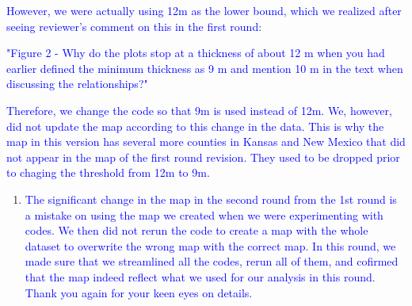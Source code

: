 \documentclass[
]{article}
\providecommand{\tightlist}{%
  \setlength{\itemsep}{0pt}\setlength{\parskip}{0pt}}
\begin{document}
\textcolor{blue}{However, we were actually using 12m as the lower bound, which we realized after seeing reviewer's comment on this in the first round:}

\textcolor{blue}{"Figure 2 - Why do the plots stop at a thickness of about 12 m when you had earlier defined the minimum thickness as 9 m and mention 10 m in the text when discussing the relationships?"}

\textcolor{blue}{Therefore, we change the code so that 9m is used instead of 12m. We, however, did not update the map according to this change in the data. This is why the map in this version has several more counties in Kansas and New Mexico that did not appear in the map of the first round revision. They used to be dropped prior to chaging the threshold from 12m to 9m.}

\begin{enumerate}
\def\labelenumi{\arabic{enumi}.}
\setcounter{enumi}{1}
\tightlist
\item
  \textcolor{blue}{The significant change in the map in the second round from the 1st round is a mistake on using the map we created when we were experimenting with codes. We then did not rerun the code to create a map with the whole dataset to overwrite the wrong map with the correct map. In this round, we made sure that we streamlined all the codes, rerun all of them, and cofirmed that the map indeed reflect what we used for our analysis in this round. Thank you again for your keen eyes on details.}
\end{enumerate}
\end{document}
